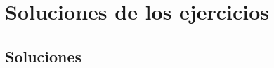 \documentclass[
    11pt, %
    fleqn, %
    a4paper, %
]{LegrandOrangeBookES}
\begin{document}



    \part{Soluciones de los ejercicios}

    \chapter*{Soluciones}

\end{document}
